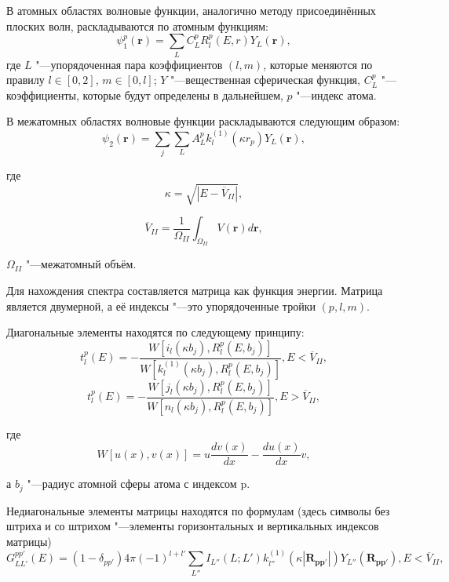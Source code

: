 В атомных областях волновые функции, аналогично методу присоединённых плоских волн, раскладываются по атомным функциям:
\begin{equation}
  \psi_1^p(\mathbf{r}) = \sum_L{C_L^p R_l^p(E, r) Y_L(\mathbf{r})},
\end{equation}
где $L$ "---упорядоченная пара коэффициентов $(l, m)$, которые меняются по правилу $l \in [0, 2]$, $m \in [0, l]$;
$Y$ "---вещественная сферическая функция, $C_L^p$ "---коэффициенты, которые будут определены в дальнейшем, $p$ "---индекс
атома.

В межатомных областях волновые функции раскладываются следующим образом:
\begin{equation}
  \psi_2(\mathbf{r}) = \sum_j{\sum_L{A_L^p k_l^{(1)}(\kappa r_p) Y_L(\mathbf{r})}},
\end{equation}

где
\begin{equation}
  \kappa = \sqrt{|E - \overline{V}_{II}|},
\end{equation}

\begin{equation}
  \overline{V}_{II} = \frac{1}{\Omega_{II}} \int_{\Omega_{II}}{V(\mathbf{r}) d\mathbf{r}},
\end{equation}

$\Omega_{II}$ "---межатомный объём.

Для нахождения спектра составляется матрица как функция энергии. Матрица является двумерной, а её индексы "---это
упорядоченные тройки $(p, l, m)$.

Диагональные элементы находятся по следующему принципу:
\begin{equation}
  t_l^p(E) = - \frac{
    W[ i_l(\kappa b_j), R_l^p(E, b_j)]
  }{
    W[ k_l^{(1)}(\kappa b_j), R_l^p(E, b_j)]
  }, E < \overline{V}_{II},
\end{equation}
\begin{equation}
  t_l^p(E) = - \frac{
    W[ j_l(\kappa b_j), R_l^p(E, b_j)]
  }{
    W[ n_l(\kappa b_j), R_l^p(E, b_j)]
  }, E > \overline{V}_{II},
\end{equation}

где
\begin{equation}
  W[ u(x), v(x) ] = u\frac{dv(x)}{dx} - \frac{du(x)}{dx}v,
\end{equation}

а $b_j$ "---радиус атомной сферы атома с индексом p.

Недиагональные элементы матрицы находятся по формулам (здесь символы без штриха и со штрихом "---элементы горизонтальных
и вертикальных индексов матрицы)
\begin{equation}
  G_{LL'}^{pp'}(E) = (1 - \delta_{pp'}) 4 \pi (-1)^{l + l'} \sum_{L''}{I_{L''}(L; L')} k_{l''}^{(1)}(\kappa |\mathbf{R_{pp'}}|)
  Y_{L''}(\mathbf{R_{pp'}}), E < \overline{V}_{II},
\end{equation}

